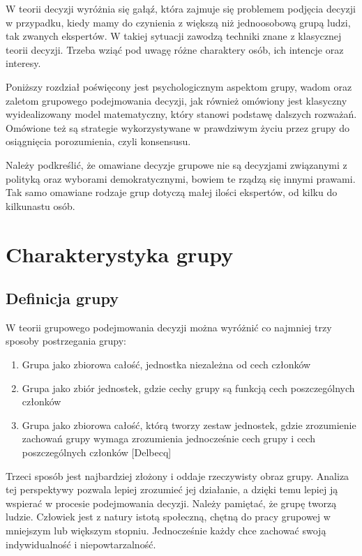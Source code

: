 W teorii decyzji wyróżnia się gałąź, która zajmuje się problemem podjęcia
decyzji w przypadku, kiedy mamy do czynienia z większą niż jednoosobową grupą
ludzi, tak zwanych ekspertów. W takiej sytuacji zawodzą techniki znane  z
klasycznej teorii decyzji. Trzeba wziąć pod uwagę różne charaktery osób, ich
intencje oraz interesy.

Poniższy rozdział poświęcony jest psychologicznym aspektom grupy, wadom oraz 
zaletom grupowego podejmowania decyzji, jak również omówiony jest klasyczny
wyidealizowany model matematyczny, który stanowi podstawę dalszych rozważań.
Omówione też są strategie wykorzystywane w prawdziwym życiu przez grupy do
osiągnięcia porozumienia, czyli konsensusu.

Należy podkreślić, że omawiane decyzje grupowe nie są decyzjami związanymi z
polityką oraz wyborami demokratycznymi, bowiem te rządzą się innymi prawami. Tak
samo omawiane rodzaje grup dotyczą małej ilości ekspertów, od kilku do
kilkunastu osób.
\section{Charakterystyka grupy}

\subsection{Definicja grupy}
W teorii grupowego podejmowania decyzji można wyróżnić co najmniej trzy sposoby 
postrzegania grupy:
\begin{enumerate}

\item Grupa jako zbiorowa całość, jednostka niezależna od cech członków

\item Grupa jako zbiór jednostek, gdzie cechy grupy są funkcją cech
poszczególnych członków

\item Grupa jako zbiorowa całość, którą tworzy zestaw jednostek, gdzie
zrozumienie zachowań grupy wymaga zrozumienia jednocześnie cech grupy i cech
poszczególnych członków [Delbecq]

\end{enumerate}
Trzeci sposób jest najbardziej złożony i oddaje rzeczywisty obraz grupy. Analiza
tej perspektywy pozwala lepiej zrozumieć jej działanie, a dzięki temu lepiej ją
wspierać w procesie podejmowania decyzji. Należy pamiętać, że grupę tworzą
ludzie. Człowiek jest z natury istotą społeczną, chętną do pracy grupowej w
mniejszym lub większym stopniu. Jednocześnie każdy chce zachować swoją
indywidualność i niepowtarzalność.

